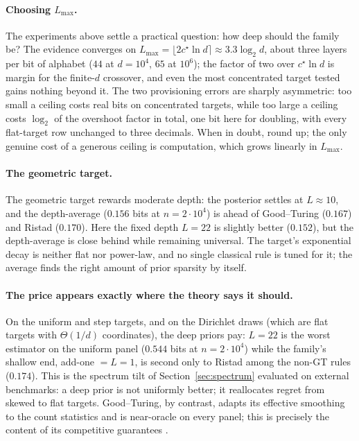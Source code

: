 \documentclass[11pt]{article}
\begin{document}
\paragraph{Choosing \(L_{\max}\).}
The experiments above settle a practical question: how deep should the
family be? The evidence converges on
\(L_{\max}=\lfloor 2c^\star\ln d\rceil\approx 3.3\log_2 d\), about three
layers per bit of alphabet (\(44\) at \(d=10^4\), \(65\) at \(10^6\)); the
factor of two over \(c^\star\ln d\) is margin for the finite-\(d\)
crossover, and even the most concentrated target tested gains nothing
beyond it. The two provisioning errors are sharply asymmetric: too small
a ceiling costs real bits on concentrated targets, while too large a
ceiling costs \(\log_2\) of the overshoot factor in total, one bit here
for doubling, with every flat-target row unchanged to three decimals.
When in doubt, round up; the only genuine cost of a generous ceiling is
computation, which grows linearly in \(L_{\max}\).


\paragraph{The geometric target.}
The geometric target rewards moderate depth: the posterior settles at
\(L\approx10\), and the depth-average (\(0.156\) bits at
\(n=2\cdot10^4\)) is ahead of Good--Turing
(\(0.167\)) and Ristad (\(0.170\)).  
Here the fixed depth $L=22$ is slightly better (\(0.152\)), but the
depth-average is close behind while remaining universal.
The target’s exponential decay is neither flat
nor power-law, and no single classical rule is tuned for it; the average
finds the right amount of prior sparsity by itself.
\paragraph{The price appears exactly where the theory says it should.}
On the uniform and step targets, and on the Dirichlet draws (which are
flat targets with \(\Theta(1/d)\) coordinates), the deep priors pay:
\(L=22\) is the worst estimator on the uniform panel (\(0.544\) bits at
\(n=2\cdot10^4\)) while the family’s shallow end, add-one \(=L{=}1\), is
second only to Ristad among the non-GT rules (\(0.174\)).  This is the spectrum tilt
of Section~\ref{sec:spectrum} evaluated on external benchmarks: a deep prior
is not uniformly better; it reallocates regret from skewed to flat targets.
Good--Turing, by contrast, adapts its effective smoothing to the count
statistics and is near-oracle on every panel; this is precisely the content
of its competitive guarantees \cite{orlitsky2015competitive}.
\end{document}
